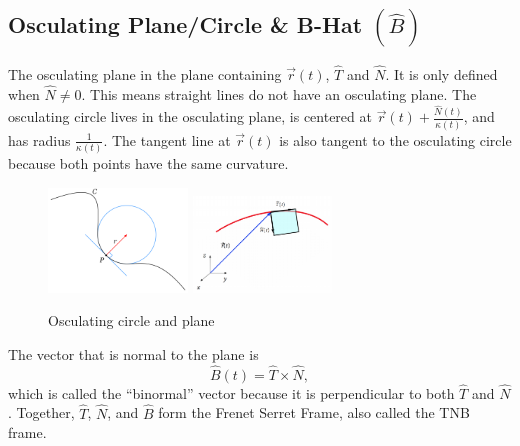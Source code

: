 \subsection{Osculating Plane/Circle \& B-Hat $\left(\hat{B}\right)$}
\noindent
The osculating plane in the plane containing $\vec{r}(t)$, $\hat{T}$ and $\hat{N}$. It is only defined when $\hat{N}\neq 0$. This means straight lines do not have an osculating plane.
The osculating circle lives in the osculating plane, is centered at $\vec{r}(t) + \frac{\hat{N}(t)}{\kappa(t)}$, and has radius $\frac{1}{\kappa(t)}$.
The tangent line at $\vec{r}(t)$ is also tangent to the osculating circle because both points have the same curvature.

\begin{figure}[H]
	\label{osculating_plane_circle}
	\centering
	\includegraphics[width = 0.33\textwidth]{./Images/vectorValuedFunctions/osculatingCircle.png}
	\includegraphics[width = 0.33\textwidth]{./Images/vectorValuedFunctions/osculatingPlane.png}
	\caption{Osculating circle and plane}
\end{figure}

\noindent
The vector that is normal to the plane is 
\begin{equation*}
	\hat{B}(t) = \hat{T}\times\hat{N},
\end{equation*}
which is called the ``binormal'' vector because it is perpendicular to both $\hat{T}$ and $\hat{N}$.
Together, $\hat{T}$, $\hat{N}$, and $\hat{B}$ form the Frenet Serret Frame, also called the TNB frame.

